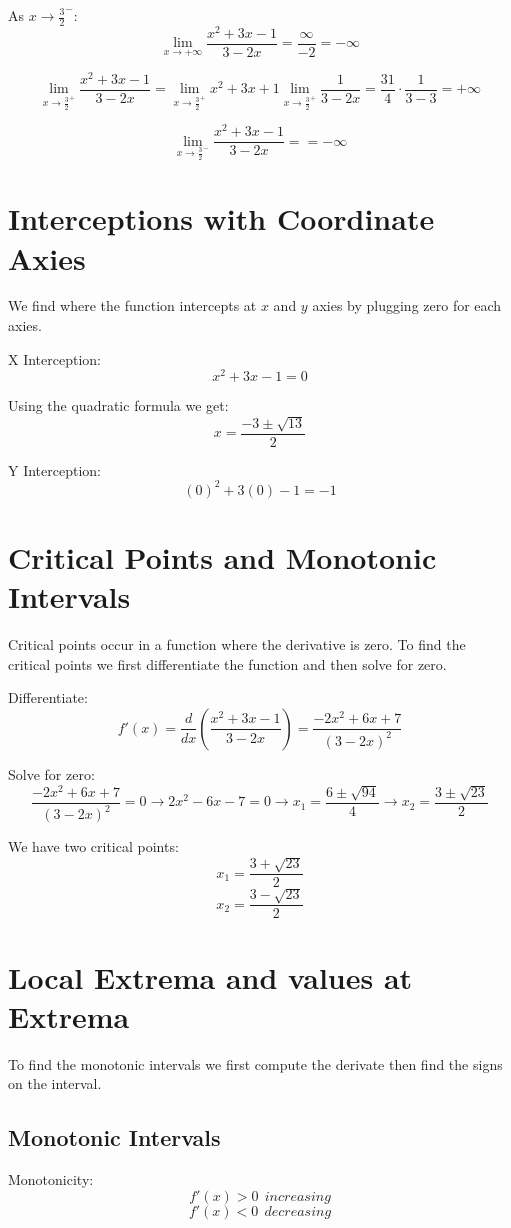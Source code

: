 \documentclass[11pt]{article}
\begin{document}
As \(x \to \frac{3}{2}^-\):
\[
\lim_{x \to +\infty} \frac{x^2+3x-1}{3-2x} = \frac{ \infty }{-2} = -\infty
\]

\[
\lim_{x\to\frac{3}{2}^+} \frac{x^2+3x-1}{3-2x} = \lim_{x\to\frac{3}{2}^+} x^2+3x+1 \lim_{x\to\frac{3}{2}^+} \frac{1}{3-2x} = \frac{31}{4} \cdot \frac{1}{3-3} = +\infty
\]

\[
\lim_{x\to\frac{3}{2}^-} \frac{x^2+3x-1}{3-2x} = = -\infty
\]
\section{Interceptions with Coordinate Axies}
\label{sec:orgaa58ef3}
We find where the function intercepts at \(x\) and \(y\) axies by plugging zero for each axies.

X Interception:
\[
x^2+3x-1=0
\]

Using the quadratic formula we get:
\[
x = \frac{-3 \pm \sqrt{13}}{2}
\]

Y Interception:
\[
(0)^2+3(0)-1 = -1
\]

\newpage
\section{Critical Points and Monotonic Intervals}
\label{sec:org9e1f265}
Critical points occur in a function where the derivative is zero. To find the critical points we first differentiate the function and then solve for zero.

Differentiate:
\[
f'(x) = \frac{d}{dx} \left( \frac{x^2+3x-1}{3-2x} \right) = \frac{-2x^2+6x+7}{(3-2x)^2}
\]

Solve for zero:
\[
\frac{-2x^2+6x+7}{(3-2x)^2} = 0 \rightarrow 2x^2-6x-7=0 \rightarrow x_1 = \frac{6 \pm \sqrt{94}}{4} \rightarrow x_2 = \frac{3 \pm \sqrt{23}}{2}
\]

We have two critical points:
\[
x_1 = \frac{3 + \sqrt{23}}{2}
\]
\[
x_2 = \frac{3 - \sqrt{23}}{2}
\]
\section{Local Extrema and values at Extrema}
\label{sec:org12b56a9}
To find the monotonic intervals we first compute the derivate then find the signs on the interval.
\subsection{Monotonic Intervals}
\label{sec:orgc149bdb}
Monotonicity:
\[
f'(x) > 0 \ \ increasing 
\]
\[
f'(x) < 0 \ \ decreasing
\]
\end{document}
